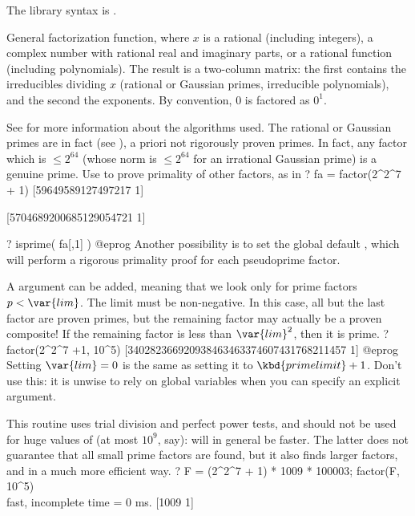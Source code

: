 The library syntax is .

\label{se:factor}
General factorization function, where $x$ is a
rational (including integers), a complex number with rational
real and imaginary parts, or a rational function (including polynomials).
The result is a two-column matrix: the first contains the irreducibles
dividing $x$ (rational or Gaussian primes, irreducible polynomials),
and the second the exponents. By convention, $0$ is factored as $0^1$.

See  for more information about the algorithms used.
The rational or Gaussian primes are in fact 
(see ), a priori not rigorously proven primes. In fact,
any factor which is $\leq 2^{64}$ (whose norm is $\leq 2^{64}$ for an
irrational Gaussian prime) is a genuine prime. Use  to prove
primality of other factors, as in
\bprog
? fa = factor(2^2^7 + 1)
[59649589127497217 1]

[5704689200685129054721 1]

? isprime( fa[,1] )
@eprog\noindent
Another possibility is to set the global default , which
will perform a rigorous primality proof for each pseudoprime factor.

A  argument  can be added, meaning that we look only for
prime factors $p < \var{lim}$. The limit  must be non-negative.
In this case, all but the last factor are proven primes, but the remaining
factor may actually be a proven composite! If the remaining factor is less
than $\var{lim}^2$, then it is prime.
\bprog
? factor(2^2^7 +1, 10^5)
[340282366920938463463374607431768211457 1]
@eprog\noindent
{} Setting $\var{lim}=0$ is the same
as setting it to $\kbd{primelimit} + 1$. Don't use this: it is unwise to
rely on global variables when you can specify an explicit argument.
\smallskip

This routine uses trial division and perfect power tests, and should not be
used for huge values of  (at most $10^9$, say):
 will in general be faster. The latter does not
guarantee that all small
prime factors are found, but it also finds larger factors, and in a much more
efficient way.
\bprog
? F = (2^2^7 + 1) * 1009 * 100003; factor(F, 10^5)  \\ fast, incomplete
time = 0 ms.
[1009 1]

